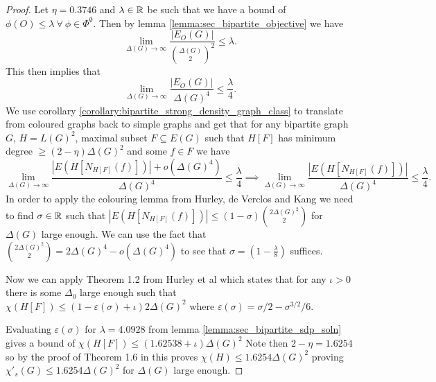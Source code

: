 \begin{proof}
    Let $\eta = 0.3746$ and $\lambda\in\mathbb{R}$ be such that we have a bound of
    $\phi(O) \leq \lambda\ \forall\ \phi\in\Phi^\emptyset$.
    Then by lemma \ref{lemma:sec_bipartite_objective} we have
    \[
        \lim_{\Delta(G) \to \infty}
        \frac{|E_O(G)|}{\binom{\Delta(G)}{2}^2}
        \leq \lambda.
    \]
    This then implies that
    \[
        \lim_{\Delta(G) \to \infty}
        \frac{|E_O(G)|}{\Delta(G)^4}
        \leq \frac{\lambda}{4}.
    \]
    We use corollary \ref{corollary:bipartite_strong_density_graph_class} to translate from
    coloured graphs back to simple graphs and get that for any bipartite graph $G$,
    $H = L(G)^2$, maximal subset $F\subseteq E(G)$ such that $H[F]$ has minimum degree
    $\geq (2-\eta)\Delta(G)^2$ and some $f\in F$ we have
    \[
        \lim_{\Delta(G) \to \infty}
        \frac{|E(H[N_{H[F]}(f)])| + o(\Delta(G)^4)}{\Delta(G)^4}
        \leq \frac{\lambda}{4}
        \implies
        \lim_{\Delta(G) \to \infty}
        \frac{|E(H[N_{H[F]}(f)])|}{\Delta(G)^4}
        \leq \frac{\lambda}{4}.
    \]
    In order to apply the colouring lemma from Hurley, de Verclos and Kang
    \cite{hurleyImprovedProcedureColouring2022} we need to find $\sigma\in\mathbb{R}$ such that
    $|E(H[N_{H[F]}(f)])| \leq (1-\sigma)\binom{2\Delta(G)^2}{2}$ for $\Delta(G)$ large
    enough. We can use the fact that
    $\binom{2\Delta(G)^2}{2} = 2\Delta(G)^4 - o(\Delta(G)^4)$
    to see that $\sigma = (1-\frac{\lambda}{8})$ suffices.

    Now we can apply Theorem 1.2 from Hurley et al \cite{hurleyImprovedProcedureColouring2022}
    which states that for any $\iota > 0$ there is some $\Delta_0$ large enough such that
    $\chi(H[F]) \leq (1-\varepsilon(\sigma) + \iota)2\Delta(G)^2$
    where $\varepsilon(\sigma) = \sigma/2 - \sigma^{3/2}/6$.

    Evaluating $\varepsilon(\sigma)$ for $\lambda = 4.0928$ from 
    lemma \ref{lemma:sec_bipartite_sdp_soln} gives a bound of
    $\chi(H[F]) \leq (1.62538 + \iota)\Delta(G)^2$
    Note then $2-\eta = 1.6254$ so by the proof of Theorem 1.6 in
    \cite{hurleyImprovedProcedureColouring2022}
    this proves $\chi(H) \leq 1.6254\Delta(G)^2$ proving
    $\chi'_s(G) \leq 1.6254\Delta(G)^2$ for $\Delta(G)$ large enough.
\end{proof}
